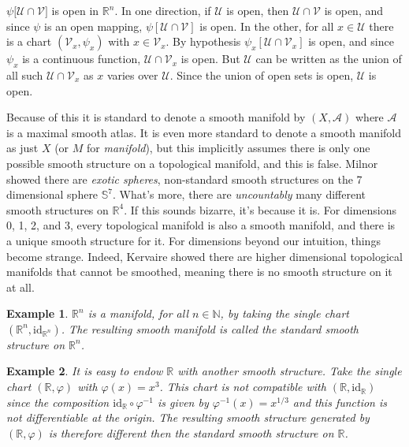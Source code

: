 \documentclass{article}
\theoremstyle{plain}
\theoremstyle{normal}
\newtheorem{example}{Example}[section]
\begin{document}
        $\psi\big[\mathcal{U}\cap\mathcal{V}]$ is open in $\mathbb{R}^{n}$. In
        one direction, if $\mathcal{U}$ is open, then
        $\mathcal{U}\cap\mathcal{V}$ is open, and since $\psi$ is an open
        mapping, $\psi[\mathcal{U}\cap\mathcal{V}]$ is open. In the other,
        for all $x\in\mathcal{U}$ there is a chart
        $(\mathcal{V}_{x},\psi_{x})$ with $x\in\mathcal{V}_{x}$. By hypothesis
        $\psi_{x}[\mathcal{U}\cap\mathcal{V}_{x}]$ is open,
        and since $\psi_{x}$ is a continuous function,
        $\mathcal{U}\cap\mathcal{V}_{x}$ is open. But $\mathcal{U}$ can be
        written as the union of all such $\mathcal{U}\cap\mathcal{V}_{x}$ as
        $x$ varies over $\mathcal{U}$. Since the union of open sets is open,
        $\mathcal{U}$ is open.
        \par\hfill\par
        Because of this it is standard to denote a smooth manifold by
        $(X,\mathcal{A})$ where $\mathcal{A}$ is a maximal smooth atlas. It is
        even more standard to denote a smooth manifold as just $X$ (or $M$ for
        \textit{manifold}), but this implicitly assumes there is only one
        possible smooth structure on a topological manifold, and this is false.
        Milnor showed there are \textit{exotic spheres}, non-standard smooth
        structures on the 7 dimensional sphere $\mathbb{S}^{7}$. What's more,
        there are \textit{uncountably} many different smooth structures on
        $\mathbb{R}^{4}$. If this sounds bizarre, it's because it is. For
        dimensions 0, 1, 2, and 3, every topological manifold is also a
        smooth manifold, and there is a unique smooth structure for it.
        For dimensions beyond our intuition, things become strange. Indeed,
        Kervaire showed there are higher dimensional topological manifolds that
        cannot be smoothed, meaning there is no smooth structure on it at all.
        \begin{example}
            $\mathbb{R}^{n}$ is a manifold, for all $n\in\mathbb{N}$, by taking
            the single chart $(\mathbb{R}^{n},\textrm{id}_{\mathbb{R}^{n}})$.
            The resulting smooth manifold is called the \textit{standard} smooth
            structure on $\mathbb{R}^{n}$.
        \end{example}
        \begin{example}
            It is easy to endow $\mathbb{R}$ with another smooth structure. Take
            the single chart $(\mathbb{R},\varphi)$ with $\varphi(x)=x^{3}$.
            This chart is not compatible with
            $(\mathbb{R},\textrm{id}_{\mathbb{R}})$ since the composition
            $\textrm{id}_{\mathbb{R}}\circ\varphi^{-1}$ is given by
            $\varphi^{-1}(x)=x^{1/3}$ and this function is not differentiable
            at the origin. The resulting smooth structure generated by
            $(\mathbb{R},\varphi)$ is therefore different then the standard
            smooth structure on $\mathbb{R}$.
        \end{example}
\end{document}
